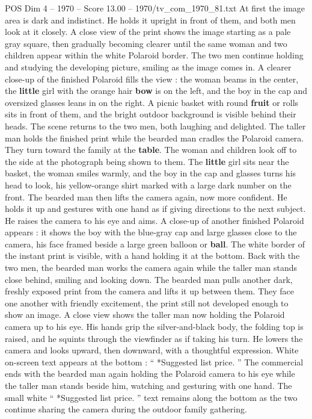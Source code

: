 \begin{textsample}{POS Dim 4 – 1970 – Score 13.00 – 1970/tv\_com\_1970\_81.txt}
At first the image area is dark and indistinct.
He holds it upright in front of them, and both men look at it closely.
A close view of the print shows the image starting as a pale gray square, then gradually becoming clearer until the same woman and two children appear within the white Polaroid border.
The two men continue holding and studying the developing picture, smiling as the image comes in.
A clearer close-up of the finished Polaroid fills the view : the woman beams in the center, the \textbf{little} girl with the orange hair \textbf{bow} is on the left, and the boy in the cap and oversized glasses leans in on the right.
A picnic basket with round \textbf{fruit} or rolls sits in front of them, and the bright outdoor background is visible behind their heads.
The scene returns to the two men, both laughing and delighted.
The taller man holds the finished print while the bearded man cradles the Polaroid camera.
They turn toward the family at the \textbf{table}.
The woman and children look off to the side at the photograph being shown to them.
The \textbf{little} girl sits near the basket, the woman smiles warmly, and the boy in the cap and glasses turns his head to look, his yellow-orange shirt marked with a large dark number on the front.
The bearded man then lifts the camera again, now more confident.
He holds it up and gestures with one hand as if giving directions to the next subject.
He raises the camera to his eye and aims.
A close-up of another finished Polaroid appears : it shows the boy with the blue-gray cap and large glasses close to the camera, his face framed beside a large green balloon or \textbf{ball}.
The white border of the instant print is visible, with a hand holding it at the bottom.
Back with the two men, the bearded man works the camera again while the taller man stands close behind, smiling and looking down.
The bearded man pulls another dark, freshly exposed print from the camera and lifts it up between them.
They face one another with friendly excitement, the print still not developed enough to show an image.
A close view shows the taller man now holding the Polaroid camera up to his eye.
His hands grip the silver-and-black body, the folding top is raised, and he squints through the viewfinder as if taking his turn.
He lowers the camera and looks upward, then downward, with a thoughtful expression.
White on-screen text appears at the bottom : “ *Suggested list price. ” The commercial ends with the bearded man again holding the Polaroid camera to his eye while the taller man stands beside him, watching and gesturing with one hand.
The small white “ *Suggested list price. ” text remains along the bottom as the two continue sharing the camera during the outdoor family gathering.

\end{textsample}
